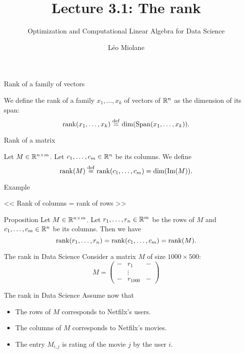 \documentclass{beamer}
\title{Lecture 3.1: The rank}
\subtitle{Optimization and Computational Linear Algebra for Data Science}
\author{Léo Miolane}
\date{}
\begin{document}
\setcounter{showProgressBar}{0}
\setcounter{showSlideNumbers}{0}

\frame{\titlepage}


\setcounter{framenumber}{0}
\setcounter{showSlideNumbers}{1}


\begin{frame}[t]{Rank of a family of vectors}
	\begin{definition}
		We define the rank of a family $x_1, \dots, x_k$ of vectors of $\mathbb{R}^n$ as the dimension of its span:
		$$
		{{\rm rank}}(x_1, \dots, x_k) \overset{\rm def}{=} {{\rm dim}} ({{\rm Span}}(x_1, \dots, x_k)).
		$$
	\end{definition}
\end{frame}

\begin{frame}[t]{Rank of a matrix}
	\begin{definition}
		Let $M \in \mathbb{R}^{n \times m}$. Let $c_1, \dots, c_m \in \mathbb{R}^n$ be its columns.
		We define
		$$
		{{\rm rank}}(M) \overset{\rm def}{=} {{\rm rank}}(c_1, \dots, c_m) = {{\rm dim}}({{\rm Im}}(M)).
		$$
	\end{definition}
\end{frame}

\begin{frame}{Example}
\end{frame}

\begin{frame}[t]{<< Rank of columns = rank of rows >>}
	\begin{block}{Proposition}
		Let $M \in \mathbb{R}^{n \times m}$. Let $r_1, \dots, r_n \in \mathbb{R}^m$ be the rows of $M$ and $c_1, \dots, c_m \in \mathbb{R}^n$ be its columns.
		Then we have
		$$
		{{\rm rank}}(r_1, \dots, r_n) = {{\rm rank}}(c_1, \dots, c_m) = {{\rm rank}}(M).
		$$
	\end{block}
\end{frame}

\begin{frame}[t]{The rank in Data Science}
	\vspace{-0.3cm}
	Consider a matrix $M$ of size $1000 \times 500$:
	$$
	M=
	\begin{pmatrix}
		- & r_1 & - \\
		  & \vdots & \\
		-  & r_{1000} & -
	\end{pmatrix}
	$$
\end{frame}
\begin{frame}[t]{The rank in Data Science}
	Assume now that
	\begin{itemize}
		\item The rows of $M$ corresponds to Netfilx's users.
		\item The columns of $M$ corresponds to Netfilx's movies.
		\item The entry $M_{i,j}$ is rating of the movie $j$ by the user $i$.
	\end{itemize}
\end{frame}
\end{document}
